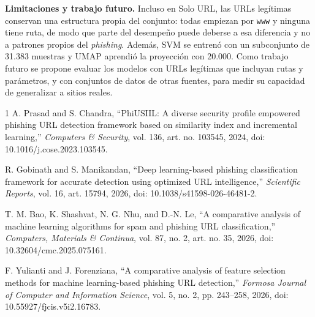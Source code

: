 \documentclass[journal]{IEEEtran}
\begin{document}
\textbf{Limitaciones y trabajo futuro.} Incluso en Solo URL, las URLs legítimas conservan una
estructura propia del conjunto: todas empiezan por \texttt{www} y ninguna tiene ruta, de modo que
parte del desempeño puede deberse a esa diferencia y no a patrones propios del \textit{phishing}.
Además, SVM se entrenó con un subconjunto de 31.383 muestras y UMAP aprendió la proyección con
20.000. Como trabajo futuro se propone evaluar los modelos con URLs legítimas que incluyan rutas y
parámetros, y con conjuntos de datos de otras fuentes, para medir su capacidad de generalizar a
sitios reales.

\begin{thebibliography}{1}
A. Prasad and S. Chandra, ``PhiUSIIL: A diverse security profile empowered phishing URL
detection framework based on similarity index and incremental learning,''
\emph{Computers \& Security}, vol. 136, art. no. 103545, 2024,
doi: 10.1016/j.cose.2023.103545.

R. Gobinath and S. Manikandan, ``Deep learning-based phishing classification framework for
accurate detection using optimized URL intelligence,'' \emph{Scientific Reports}, vol. 16,
art. 15794, 2026, doi: 10.1038/s41598-026-46481-2.

T. M. Bao, K. Shashvat, N. G. Nhu, and D.-N. Le, ``A comparative analysis of machine learning
algorithms for spam and phishing URL classification,'' \emph{Computers, Materials \& Continua},
vol. 87, no. 2, art. no. 35, 2026, doi: 10.32604/cmc.2025.075161.

F. Yulianti and J. Forenziana, ``A comparative analysis of feature selection methods for
machine learning-based phishing URL detection,'' \emph{Formosa Journal of Computer and
Information Science}, vol. 5, no. 2, pp. 243--258, 2026, doi: 10.55927/fjcis.v5i2.16783.
\end{thebibliography}
\end{document}
